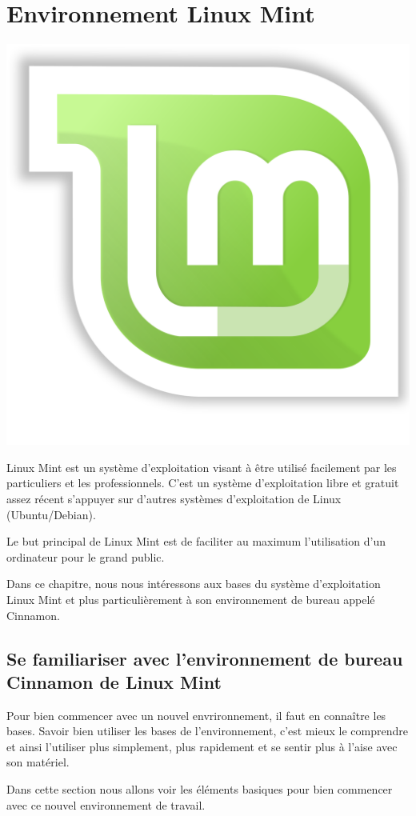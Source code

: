 \documentclass[12pt]{book}
\begin{document}
\chapter{Environnement Linux Mint}
\begin{minipage}[ct]{.18\textwidth}
	\centering
	\includegraphics[width=.85\textwidth]{include/lm_logo.png}
\end{minipage}
\begin{minipage}[c]{.77\textwidth}
	Linux Mint est un système d'exploitation visant à être utilisé facilement par les particuliers et les professionnels.
	C'est un système d'exploitation libre et gratuit assez récent s'appuyer sur d'autres systèmes d'exploitation de Linux (Ubuntu/Debian).
\end{minipage}\par
Le but principal de Linux Mint est de faciliter au maximum l'utilisation d'un ordinateur pour le grand public.\par
Dans ce chapitre, nous nous intéressons aux bases du système d'exploitation Linux Mint et plus particulièrement à son environnement de bureau appelé Cinnamon.
\section{Se familiariser avec l'environnement de bureau Cinnamon de Linux Mint}
	Pour bien commencer avec un nouvel envrironnement, il faut en connaître les bases.
	Savoir bien utiliser les bases de l'environnement, c'est mieux le comprendre et ainsi l'utiliser plus simplement, plus rapidement et se sentir plus à l'aise avec son matériel.\par
	Dans cette section nous allons voir les éléments basiques pour bien commencer avec ce nouvel environnement de travail.
\end{document}
